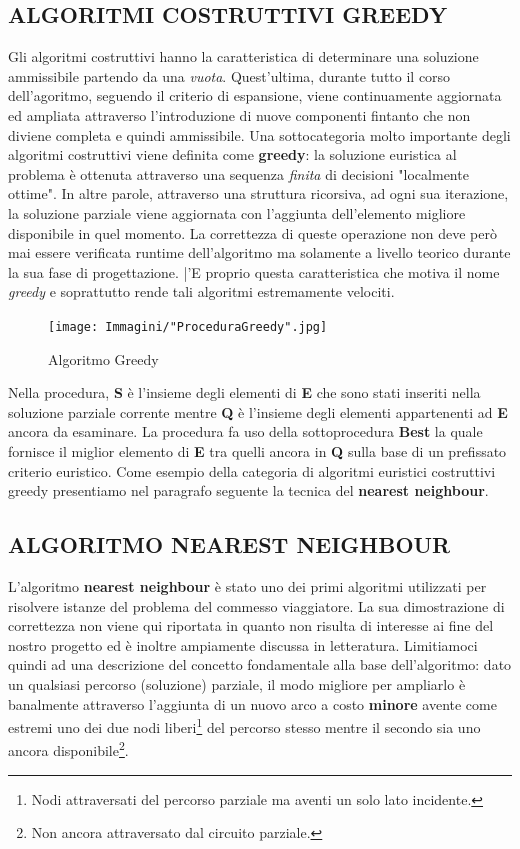 \documentclass[11pt]{article}
\begin{document}
\subsection*{ALGORITMI COSTRUTTIVI GREEDY}

Gli algoritmi costruttivi hanno la caratteristica di determinare una soluzione ammissibile partendo da una \textit{vuota}. Quest'ultima, durante tutto il corso dell'agoritmo, seguendo il criterio di espansione, viene continuamente aggiornata ed ampliata attraverso l'introduzione di nuove componenti fintanto che non diviene completa e quindi ammissibile.
Una sottocategoria molto importante degli algoritmi costruttivi viene definita come \textbf{greedy}: la soluzione euristica al problema è ottenuta attraverso una sequenza \textit{finita} di decisioni "localmente ottime". In altre parole, attraverso una struttura ricorsiva, ad ogni sua iterazione, la soluzione parziale viene aggiornata con l'aggiunta dell'elemento migliore disponibile in quel momento. La correttezza di queste operazione non deve però mai essere verificata runtime dell'algoritmo ma solamente a livello teorico durante la sua fase di progettazione. |'E proprio questa caratteristica che motiva il nome \textit{greedy} e soprattutto rende tali algoritmi estremamente velociti.

\begin{figure}[htbp]
    \centering
    \texttt{[image: Immagini/"ProceduraGreedy".jpg]}
    \caption{Algoritmo Greedy}
\end{figure}

Nella procedura, \textbf{S} è l'insieme degli elementi di \textbf{E} che sono stati inseriti nella soluzione parziale corrente mentre \textbf{Q} è l'insieme degli elementi appartenenti ad \textbf{E} ancora da esaminare.
La procedura fa uso della sottoprocedura \textbf{Best} la quale fornisce il miglior elemento di \textbf{E} tra quelli ancora in \textbf{Q} sulla base di un prefissato criterio euristico.
Come esempio della categoria di algoritmi euristici costruttivi greedy presentiamo nel paragrafo seguente la tecnica del \textbf{nearest neighbour}.

\subsection*{ALGORITMO NEAREST NEIGHBOUR}

L'algoritmo \textbf{nearest neighbour} è stato uno dei primi algoritmi utilizzati per risolvere istanze del problema del commesso viaggiatore. La sua dimostrazione di correttezza non viene qui riportata in quanto non risulta di interesse ai fine del nostro progetto ed è inoltre ampiamente discussa in letteratura. Limitiamoci quindi ad una descrizione del concetto fondamentale alla base dell'algoritmo: dato un qualsiasi percorso (soluzione) parziale, il modo migliore per ampliarlo è banalmente attraverso l'aggiunta di un nuovo arco a costo \textbf{minore} avente come estremi uno dei due nodi liberi\footnote{Nodi attraversati del percorso parziale ma aventi un solo lato incidente.} del percorso stesso mentre il secondo sia uno ancora disponibile\footnote{Non ancora attraversato dal circuito parziale.}.
\end{document}
